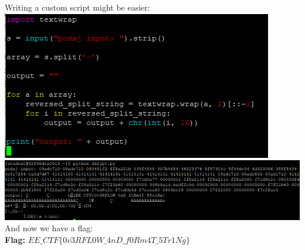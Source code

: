 \documentclass{article}
\begin{document}
Writing a custom script might be easier:
\vspace{3mm} \\
\includegraphics[width=\textwidth]{"image58.png"}
\vspace{3mm}
\includegraphics[width=\textwidth]{"image59.png"}
And now we have a flag:
\vspace{3mm} \\
\textbf{Flag:} $ EE\_CTF\{0v3RFL0W\_4nD\_f0Rm4T\_5Tr1Ng\} $

\newpage
\end{document}
